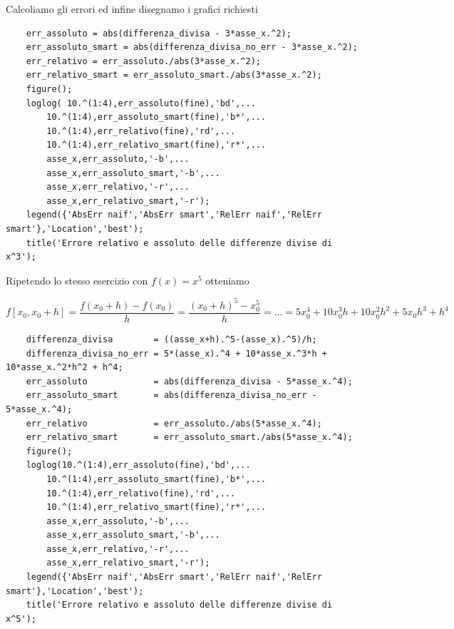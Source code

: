 \documentclass{article}
\begin{document}
Calcoliamo gli errori ed infine disegnamo i grafici richiesti

\begin{lstlisting}
	err_assoluto = abs(differenza_divisa - 3*asse_x.^2);
	err_assoluto_smart = abs(differenza_divisa_no_err - 3*asse_x.^2);
	err_relativo = err_assoluto./abs(3*asse_x.^2);
	err_relativo_smart = err_assoluto_smart./abs(3*asse_x.^2);
	figure();
	loglog( 10.^(1:4),err_assoluto(fine),'bd',...
		10.^(1:4),err_assoluto_smart(fine),'b*',...
		10.^(1:4),err_relativo(fine),'rd',...
		10.^(1:4),err_relativo_smart(fine),'r*',...
		asse_x,err_assoluto,'-b',...
		asse_x,err_assoluto_smart,'-b',...
		asse_x,err_relativo,'-r',...
		asse_x,err_relativo_smart,'-r');
	legend({'AbsErr naif','AbsErr smart','RelErr naif','RelErr smart'},'Location','best');
	title('Errore relativo e assoluto delle differenze divise di x^3');
\end{lstlisting}



\clearpage

Ripetendo lo stesso esercizio con $f\left(x\right)=x^5$ otteniamo

\begin{equation*}
	f[x_0 ,x_0 +h]
	=\frac{f(x_0 +h)-f(x_0 )}{h}
	=\frac{{(x_0 +h)}^5 -x_0^5 }{h}
	=\ldots=
	5x_0^4 +10x_0^3 h+10x_0^2 h^2 +5x_0 h^3 +h^4
\end{equation*}

\begin{lstlisting}
	differenza_divisa        = ((asse_x+h).^5-(asse_x).^5)/h;
	differenza_divisa_no_err = 5*(asse_x).^4 + 10*asse_x.^3*h + 10*asse_x.^2*h^2 + h^4;
	err_assoluto             = abs(differenza_divisa - 5*asse_x.^4);
	err_assoluto_smart       = abs(differenza_divisa_no_err - 5*asse_x.^4);
	err_relativo             = err_assoluto./abs(5*asse_x.^4);
	err_relativo_smart       = err_assoluto_smart./abs(5*asse_x.^4);
	figure();
	loglog(10.^(1:4),err_assoluto(fine),'bd',...
		10.^(1:4),err_assoluto_smart(fine),'b*',...
		10.^(1:4),err_relativo(fine),'rd',...
		10.^(1:4),err_relativo_smart(fine),'r*',...
		asse_x,err_assoluto,'-b',...
		asse_x,err_assoluto_smart,'-b',...
		asse_x,err_relativo,'-r',...
		asse_x,err_relativo_smart,'-r');
	legend({'AbsErr naif','AbsErr smart','RelErr naif','RelErr smart'},'Location','best');
	title('Errore relativo e assoluto delle differenze divise di x^5');
\end{lstlisting}


\end{document}
